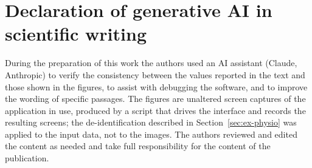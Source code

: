 \documentclass[11pt, letterpaper]{article}
\begin{document}
\section*{Declaration of generative AI in scientific writing}

During the preparation of this work the authors used an AI assistant (Claude, Anthropic) to verify the consistency between the values reported in the text and those shown in the figures, to assist with debugging the software, and to improve the wording of specific passages. The figures are unaltered screen captures of the application in use, produced by a script that drives the interface and records the resulting screens; the de-identification described in Section~\ref{sec:ex-physio} was applied to the input data, not to the images. The authors reviewed and edited the content as needed and take full responsibility for the content of the publication.
\end{document}
